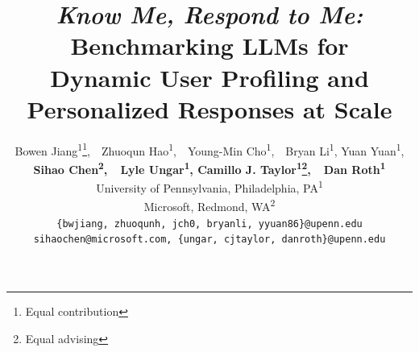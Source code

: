 \documentclass{article} %
\title{\textit{Know Me, Respond to Me:} Benchmarking LLMs for \\ Dynamic User Profiling and Personalized Responses at Scale}
\author{Bowen Jiang\textsuperscript{1}\thanks{Equal contribution},\ \ Zhuoqun Hao\textsuperscript{1}\footnotemark[1],\ \ Young-Min Cho\textsuperscript{1},\ \ Bryan Li\textsuperscript{1}, Yuan Yuan\textsuperscript{1}, \\ {\bf  Sihao Chen\textsuperscript{2},\ \ Lyle Ungar\textsuperscript{1}, Camillo J. Taylor\textsuperscript{1}\thanks{Equal advising},\ \ Dan Roth\textsuperscript{1}\footnotemark[2]} \\ 
University of Pennsylvania, Philadelphia, PA\textsuperscript{1} \\
Microsoft, Redmond, WA\textsuperscript{2} \\
\small{
\texttt{\{bwjiang, zhuoqunh, jch0, bryanli, yyuan86\}@upenn.edu}}\\
\small{
\texttt{sihaochen@microsoft.com, \{ungar, cjtaylor, danroth\}@upenn.edu}
}
}
\begin{document}
\maketitle



%

\newcommand{\fix}{\marginpar{FIX}}
\newcommand{\new}{\marginpar{NEW}}

\ifcolmsubmission
\linenumbers
\fi

    










\newpage
\appendix

\end{document}
